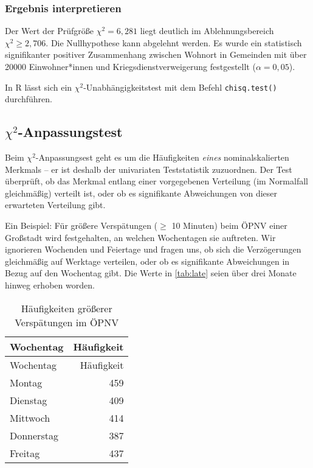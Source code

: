 \documentclass[
  ngerman,
]{article}
\begin{document}
\hypertarget{ergebnis-interpretieren-2}{%
\subsubsection{Ergebnis interpretieren}\label{ergebnis-interpretieren-2}}

Der Wert der Prüfgröße \(\chi^2=6,281\) liegt deutlich im Ablehnungsbereich \(\chi^2\geq 2,706\). Die Nullhypothese kann abgelehnt werden. Es wurde ein statistisch signifikanter positiver Zusammenhang zwischen Wohnort in Gemeinden mit über 20000 Einwohner*innen und Kriegsdienstverweigerung festgestellt (\(\alpha=0,05\)).

\begin{rtip}
In R lässt sich ein $\chi^2$-Unabhängigkeitstest mit dem Befehl {\tt chisq.test()} durchführen.
\end{rtip}

\hypertarget{chi2-anpassungstest}{%
\subsection{\texorpdfstring{\(\chi^2\)-Anpassungstest}{\textbackslash chi\^{}2-Anpassungstest}}\label{chi2-anpassungstest}}

Beim \(\chi^2\)-Anpassungsest geht es um die Häufigkeiten \emph{eines} nominalskalierten Merkmals -- er ist deshalb der univariaten Teststatistik zuzuordnen. Der Test überprüft, ob das Merkmal entlang einer vorgegebenen Verteilung (im Normalfall gleichmäßig) verteilt ist, oder ob es signifikante Abweichungen von dieser erwarteten Verteilung gibt.

Ein Beispiel: Für größere Verspätungen (\(\geq\) 10 Minuten) beim ÖPNV einer Großstadt wird festgehalten, an welchen Wochentagen sie auftreten. Wir ignorieren Wochenden und Feiertage und fragen uns, ob sich die Verzögerungen gleichmäßig auf Werktage verteilen, oder ob es signifikante Abweichungen in Bezug auf den Wochentag gibt. Die Werte in \autoref{tab:late} seien über drei Monate hinweg erhoben worden.

\begin{longtable}[]{@{}lr@{}}
\caption{\label{tab:late}Häufigkeiten größerer Verspätungen im ÖPNV}\tabularnewline
\toprule
Wochentag & Häufigkeit\tabularnewline
\midrule
\endfirsthead
\toprule
Wochentag & Häufigkeit\tabularnewline
\midrule
\endhead
Montag & 459\tabularnewline
Dienstag & 409\tabularnewline
Mittwoch & 414\tabularnewline
Donnerstag & 387\tabularnewline
Freitag & 437\tabularnewline
\bottomrule
\end{longtable}
\end{document}
